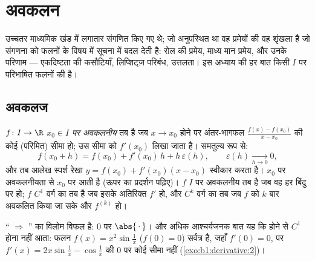 \chapter{अवकलन}\label{ch:b1:derivative}

उच्चतर माध्यमिक खंड में  लगातार संगणित किए गए थे; जो अनुपस्थित था वह
प्रमेयों की वह शृंखला है जो संगणना को फलनों के विषय में सूचना में बदल देती
है: रोल की प्रमेय, माध्य मान प्रमेय, और उनके परिणाम --- एकदिष्टता की
कसौटियाँ, लिप्शिट्ज़ परिबंध, उत्तलता। इस अध्याय की हर बात किसी  $I$ पर
परिभाषित फलनों की है।

\section{अवकलज}

\begin{definition}\label{def:b1:derivative:def}
$f \colon I \to \R$ \emph{$x_0 \in I$ पर अवकलनीय} तब है जब $x
\to x_0$ होने पर अंतर-भागफल $\frac{f(x) - f(x_0)}{x - x_0}$ की कोई (परिमित)
सीमा हो; उस सीमा को $f'(x_0)$ लिखा जाता है। समतुल्य रूप से:
\[
f(x_0 + h) = f(x_0) + f'(x_0)\,h + h\,\varepsilon(h),
\qquad \varepsilon(h) \xrightarrow[h \to 0]{} 0 ,
\]
और तब आलेख स्पर्श रेखा $y = f(x_0) + f'(x_0)(x - x_0)$ स्वीकार करता है।
$x_0$ पर अवकलनीयता से $x_0$ पर  आती है (ऊपर का प्रदर्शन पढ़िए)। $f$
$I$ पर अवकलनीय तब है जब वह हर बिंदु पर हो; $f$ $C^1$ वर्ग का तब है जब इसके
अतिरिक्त $f'$  हो, और $C^k$ वर्ग का तब जब
$f$ को $k$ बार अवकलित किया जा सके और $f^{(k)}$  हो।
\end{definition}

\begin{example}\label{ex:b1:derivative:notc1}
`` $\Rightarrow$ '' का विलोम विफल है: $0$ पर $\abs{\,\cdot\,}$।
और अधिक आश्चर्यजनक बात यह कि  होने से $C^1$ होना नहीं आता: फलन $f(x)
= x^2 \sin\frac 1x$ ($f(0) = 0$) सर्वत्र  है, जहाँ $f'(0) = 0$, पर
$f'(x) = 2x \sin\frac1x - \cos\frac 1x$ की $0$ पर कोई सीमा नहीं
(\cref{exo:b1:derivative:2})।
\end{example}

